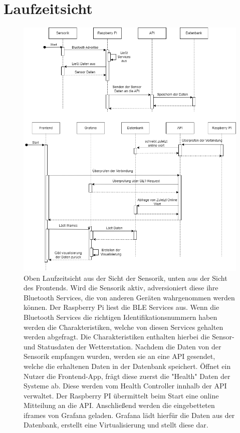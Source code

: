 \documentclass[
]{article}
\begin{document}
\section{Laufzeitsicht}
\begin{figure}[H]
	\centering
	\includegraphics[width=160mm]{resources/Laufzeitsicht.png}
	\caption{Oben Laufzeitsicht aus der Sicht der Sensorik, unten aus der Sicht des Frontends. Wird die Sensorik aktiv, adversioniert diese ihre Bluetooth Services, die von anderen Geräten wahrgenommen werden können. Der Raspberry Pi liest die BLE Services aus. Wenn die Bluetooth Services die richtigen Identifikationsnummern haben werden die Charakteristiken, welche von diesen Services gehalten werden abgefragt. Die Charakteristiken enthalten hierbei die Sensor- und Statusdaten der Wetterstation. Nachdem die Daten von der Sensorik empfangen wurden, werden sie an eine API gesendet, welche die erhaltenen Daten in der Datenbank speichert. Öffnet ein Nutzer die Frontend-App, frägt diese zuerst die "Health" Daten der Systeme ab. Diese werden vom Health Controller innhalb der API verwaltet. Der Raspberry PI übermittelt beim Start eine online Mitteilung an die API. Anschließend werden die eingebetteten iframes von Grafana geladen. Grafana lädt hierfür die Daten aus der Datenbank, erstellt eine Virtualisierung und stellt diese dar.}
	\label{fig:Laufzeitsicht}
\end{figure}  
\end{document}

